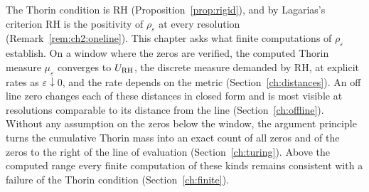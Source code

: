 \label{chap:measure}

The Thorin condition is RH (Proposition~\ref{prop:rigid}), and by Lagarias's criterion RH is the positivity of $\rho_\varepsilon$ at every resolution (Remark~\ref{rem:ch2:oneline}). This chapter asks what finite computations of $\rho_\varepsilon$ establish. On a window where the zeros are verified, the computed Thorin measure $\mu_\varepsilon$ converges to $U_{\mathrm{RH}}$, the discrete measure demanded by RH, at explicit rates as $\varepsilon\downarrow0$, and the rate depends on the metric (Section~\ref{ch:distances}). An off line zero changes each of these distances in closed form and is most visible at resolutions comparable to its distance from the line (Section~\ref{ch:offline}). Without any assumption on the zeros below the window, the argument principle turns the cumulative Thorin mass into an exact count of all zeros and of the zeros to the right of the line of evaluation (Section~\ref{ch:turing}). Above the computed range every finite computation of these kinds remains consistent with a failure of the Thorin condition (Section~\ref{ch:finite}).
